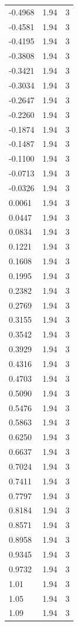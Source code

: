 \begin{longtable}{lrr}
  -0.4968 & 1.94 & 3 \\
  -0.4581 & 1.94 & 3 \\
  -0.4195 & 1.94 & 3 \\
  -0.3808 & 1.94 & 3 \\
  -0.3421 & 1.94 & 3 \\
  -0.3034 & 1.94 & 3 \\
  -0.2647 & 1.94 & 3 \\
  -0.2260 & 1.94 & 3 \\
  -0.1874 & 1.94 & 3 \\
  -0.1487 & 1.94 & 3 \\
  -0.1100 & 1.94 & 3 \\
  -0.0713 & 1.94 & 3 \\
  -0.0326 & 1.94 & 3 \\
  0.0061 & 1.94 & 3 \\
  0.0447 & 1.94 & 3 \\
  0.0834 & 1.94 & 3 \\
  0.1221 & 1.94 & 3 \\
  0.1608 & 1.94 & 3 \\
  0.1995 & 1.94 & 3 \\
  0.2382 & 1.94 & 3 \\
  0.2769 & 1.94 & 3 \\
  0.3155 & 1.94 & 3 \\
  0.3542 & 1.94 & 3 \\
  0.3929 & 1.94 & 3 \\
  0.4316 & 1.94 & 3 \\
  0.4703 & 1.94 & 3 \\
  0.5090 & 1.94 & 3 \\
  0.5476 & 1.94 & 3 \\
  0.5863 & 1.94 & 3 \\
  0.6250 & 1.94 & 3 \\
  0.6637 & 1.94 & 3 \\
  0.7024 & 1.94 & 3 \\
  0.7411 & 1.94 & 3 \\
  0.7797 & 1.94 & 3 \\
  0.8184 & 1.94 & 3 \\
  0.8571 & 1.94 & 3 \\
  0.8958 & 1.94 & 3 \\
  0.9345 & 1.94 & 3 \\
  0.9732 & 1.94 & 3 \\
  1.01 & 1.94 & 3 \\
  1.05 & 1.94 & 3 \\
  1.09 & 1.94 & 3 \\

\end{longtable}
